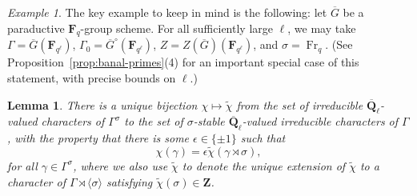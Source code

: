 \documentclass[reqno]{amsart}
\numberwithin{equation}{subsection}
\newcommand{\F}{\mathbf{F}}
\newcommand{\wt}[1]{\widetilde{#1}}
\newcommand{\Q}{\mathbf{Q}}
\newcommand{\Z}{\mathbf{Z}}
\newcommand{\ol}[1]{\overline{#1}}
\DeclareMathOperator{\Fr}{Fr}
\newtheorem{lemma}[thm]{Lemma}
\theoremstyle{remark}
\newtheorem{example}[thm]{Example}
\numberwithin{equation}{subsection}
\numberwithin{figure}{subsection}
\begin{document}
\begin{example}
The key example to keep in mind is the following: let $\ol{G}$ be a paraductive $\F_q$-group scheme. For all sufficiently large $\ell$, we may take $\Gamma = \ol{G}(\F_{q^\ell})$, $\Gamma_0 = \ol{G}^\circ(\F_{q^\ell})$, $Z = Z(\ol G)(\F_{q^\ell})$, and $\sigma = \Fr_q$. (See Proposition~\ref{prop:banal-primes}(4) for an important special case of this statement, with precise bounds on $\ell$.)
\end{example}

\begin{lemma}\label{lemma:infinite-glauberman}
    There is a unique bijection $\chi \mapsto \wt\chi$ from the set of irreducible $\ol\Q_\ell$-valued characters of $\Gamma^\sigma$ to the set of $\sigma$-stable $\ol\Q_\ell$-valued irreducible characters of $\Gamma$, with the property that there is some $\epsilon \in \{\pm 1\}$ such that
    \[
    \chi(\gamma) = \epsilon\wt\chi(\gamma \rtimes \sigma),
    \]
    for all $\gamma \in \Gamma^\sigma$, where we also use $\wt\chi$ to denote the unique extension of $\wt\chi$ to a character of $\Gamma \rtimes \langle\sigma\rangle$ satisfying $\wt\chi(\sigma) \in \Z$.
\end{lemma}
\end{document}
